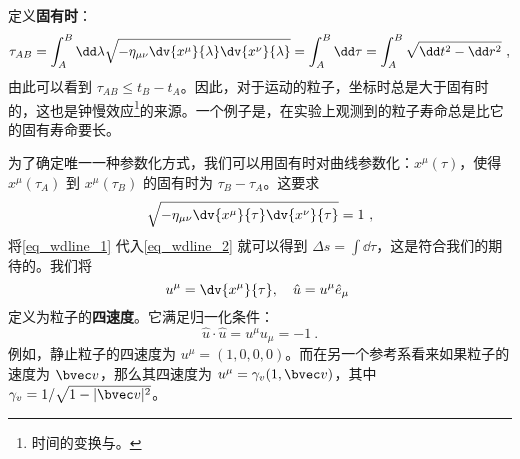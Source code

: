 定义\textbf{固有时}：
\begin{equation}
\tau_{AB}=\int_{A}^{B} \dd\lambda \sqrt{-\eta_{\mu\nu}\dv{x^\mu}{\lambda} \dv{x^\nu}{\lambda}}=\int_A^B \dd \tau = \int_A^B \sqrt{\dd t^2-\dd r^2}~,
\end{equation}
由此可以看到 $\tau_{AB}\le t_B-t_A$。因此，对于运动的粒子，坐标时总是大于固有时的，这也是钟慢效应\footnote{时间的变换与\textbf{}。}的来源。一个例子是，在实验上观测到的粒子寿命总是比它的固有寿命要长。

为了确定唯一一种参数化方式，我们可以用固有时对曲线参数化：$x^\mu(\tau)$，使得 $x^\mu(\tau_A)$ 到 $x^\mu(\tau_B)$ 的固有时为 $\tau_B-\tau_A$。这要求
\begin{equation}\label{eq_wdline_1}
\sqrt{-\eta_{\mu\nu}\dv{x^\mu}{\tau} \dv{x^\nu}{\tau}}=1~,
\end{equation}
将\autoref{eq_wdline_1} 代入\autoref{eq_wdline_2} 就可以得到 $\Delta s=\int \dd \tau$，这是符合我们的期待的。我们将
\begin{equation}
u^\mu=\dv{x^\mu}{\tau},\quad \hat u=u^\mu \hat{e}_\mu~
\end{equation}
定义为粒子的\textbf{四速度}。它满足归一化条件：
\begin{equation}
\hat u \cdot \hat u = u^\mu u_\mu = -1~.
\end{equation}
例如，静止粒子的四速度为 $u^\mu=(1,0,0,0)$。而在另一个参考系看来如果粒子的速度为 $\bvec v$，那么其四速度为 $u^\mu=\gamma_v(1,\bvec v)$，其中 $\gamma_v=1/\sqrt{1-|\bvec v|^2}$。
